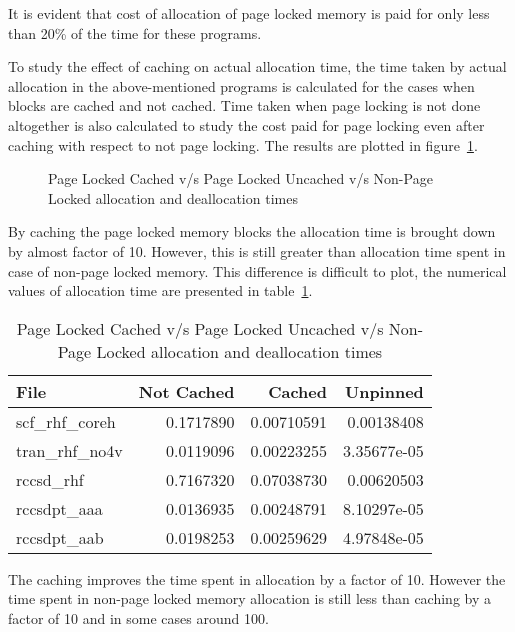 It is evident that cost of allocation of page locked memory is
paid for only less than 20\% of the time for these programs.

To study the effect of caching on actual allocation time, the time taken by actual
allocation in the above-mentioned programs is calculated for the cases when blocks
are cached and not cached. Time taken when page locking is not done altogether is
also calculated to study the cost paid for page locking even after caching with
respect to not page locking. The results are plotted in figure~\ref{fig:mempin_caching}.

\begin{figure}[h]
  
  \caption{Page Locked Cached v/s Page Locked Uncached v/s Non-Page Locked allocation
  and deallocation times}
  \label{fig:mempin_caching}
\end{figure}

By caching the page locked memory blocks the allocation time is brought down by
almost factor of 10. However, this is still greater than allocation time spent in
case of non-page locked memory. This difference is difficult to plot, the numerical
values of allocation time are presented in table~\ref{tab:mempin_caching}.

\begin{table}[h]
  \centering
  \begin{tabular}{l | r | r | r}
    \hline
    File            & Not Cached & Cached     & Unpinned    \\
    \hline
    scf\_rhf\_coreh & 0.1717890  & 0.00710591 & 0.00138408  \\
    tran\_rhf\_no4v & 0.0119096  & 0.00223255 & 3.35677e-05 \\
    rccsd\_rhf      & 0.7167320  & 0.07038730 & 0.00620503  \\
    rccsdpt\_aaa    & 0.0136935  & 0.00248791 & 8.10297e-05 \\
    rccsdpt\_aab    & 0.0198253  & 0.00259629 & 4.97848e-05 \\
    \hline
  \end{tabular}
  \caption{Page Locked Cached v/s Page Locked Uncached v/s Non-Page Locked allocation
  and deallocation times}
  \label{tab:mempin_caching}
\end{table}

The caching improves the time spent in allocation by a factor of 10. However the time
spent in non-page locked memory allocation is still less than caching by a factor
of 10 and in some cases around 100.